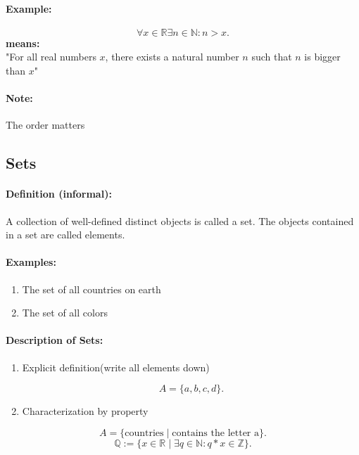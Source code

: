 \documentclass[twocolumn]{article}
\begin{document}
			\paragraph{Example:}
				\[
				\forall x\in\mathbb R\exists n\in\mathbb N:n>x
				.\]
				\textbf{means:}\\
				"For all real numbers $x$, there exists a natural number
				$n$ such that $n$ is bigger than $x$" 
			\paragraph{Note:}
				The order matters

	\subsection{Sets}
			\paragraph{Definition (informal):}
				A collection of well-defined distinct objects is called a set.
				The objects contained in a set are called elements.
			\paragraph{Examples:}
				\begin{enumerate}
				\item The set of all countries on earth
				\item The set of all colors
				\end{enumerate}
			\paragraph{Description of Sets:}
				\begin{enumerate}
				\item Explicit definition(write all elements down)

					\[
					A=\{a,b,c,d\}
					.\]  
				\item Characterization by property
				\end{enumerate}
					\[
					A=\{\mbox{countries}\mid\mbox{contains the letter a}\}
					.\] 
					\[
					\mathbb Q:=\{x\in\mathbb R\mid\exists q\in\mathbb N
					:q*x\in\mathbb Z\} 
					.\] 
\end{document}
